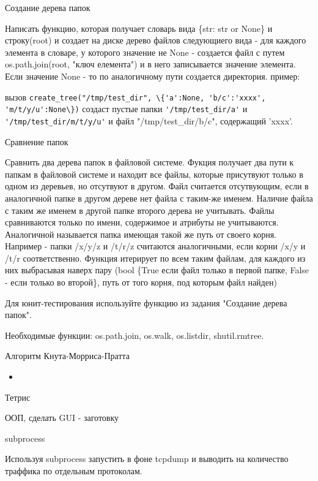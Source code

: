 \documentclass{article}
\begin{document}
\begin{center} Создание дерева папок \end{center}
Написать функцию, которая получает словарь вида 
\{str: str or None\} и строку(root) и создает на диске дерево файлов следующиего вида - 
для каждого элемента в словаре, у которого значение не None - создается файл 
с путем os.path.join(root, "ключ елемента") и в него записывается значение элемента.
Если значение None - то по аналогичному пути создается директория.
пример:

вызов \lstinline!create_tree("/tmp/test_dir", \{'a':None, 'b/c':'xxxx', 'm/t/y/u':None\})!
создаст пустые папки \lstinline!'/tmp/test_dir/a'! и \lstinline!'/tmp/test_dir/m/t/y/u'!
и файл "/tmp/test\_dir/b/c", содержащий 'xxxx'.

\newpage

\begin{center} Сравнение папок \end{center}
Сравнить два дерева папок в файловой системе. Фукция получает два пути к 
папкам в файловой системе и находит все файлы, которые присутвуют только в 
одном из деревьев, но отсутвуют в другом. Файл считается отсутвующим, если 
в аналогичной папке в другом дереве нет файла с таким-же именем. Наличие файла 
с таким же именем в другой папке второго дерева не учитывать. Файлы сравниваются
только по имени, содержимое и атрибуты не учитываются. Аналогичной называется 
папка имеющая такой же путь от своего корня. Например - папки
/x/y/z и /t/r/z считаются аналогичными, если корни /x/y и /t/r соответственно.
Функция итерирует по всем таким файлам, для каждого из них выбрасывая наверх
пару (bool \{True если файл только в первой папке, False - если только во второй\},
 путь от того корня, под которым файл найден)

Для юнит-тестирования используйте функцию из задания "Создание дерева папок".

Необходимые функции: os.path.join, os.walk, os.listdir, shutil.rmtree.
\newpage

\begin{center} Алгоритм Кнута-Морриса-Пратта \end{center}
\begin{itemize}
    \item 
\end{itemize}
\newpage

\begin{center} Тетрис \end{center}
ООП, сделать GUI - заготовку
\newpage

\begin{center} subprocess \end{center}
Используя subprocess запустить в фоне tcpdump и выводить на количество траффика
по отдельным протоколам.
\newpage

\end{document}
